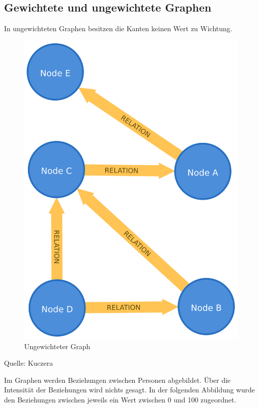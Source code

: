 \documentclass[ngerman,]{scrreprt}
\begin{document}
\subsection{Gewichtete und ungewichtete Graphen}\label{gewichtete-und-ungewichtete-graphen}

In ungewichteten Graphen besitzen die Kanten keinen Wert zu Wichtung.

\begin{figure}
\centering
\includegraphics{Bilder/unWeightedGraph.png}
\caption{Ungewichteter Graph}
\end{figure}

Quelle: Kuczera

Im Graphen werden Beziehungen zwischen Personen abgebildet. Über die Intensität der Beziehungen wird nichts gesagt. In der folgenden Abbildung wurde den Beziehungen zwischen jeweils ein Wert zwischen 0 und 100 zugeordnet.
\end{document}
